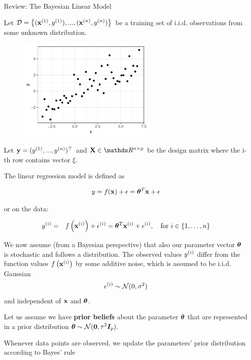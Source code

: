 \documentclass[11pt,compress,t,notes=noshow, xcolor=table]{beamer}
\begin{document}
\begin{vbframe}{Review: The Bayesian Linear Model}

Let $\D = \left\{(\xi[1], \yi[1]), ..., (\xi[n], \yi[n])\right\}$ be a training set of i.i.d. observations from some unknown distribution.

\begin{figure}
  \includegraphics[width=0.6\textwidth]{figure/bayes_lm/example.pdf}
\end{figure}

Let $\yv = (\yi[1], ..., \yi[n])^\top$ and $\Xmat \in \R^{n \times p}$ be the design matrix where the i-th row contains vector $\xi$.  

\framebreak

The linear regression model is defined as

$$
y = \fx + \epsilon = \thetab^T \xv + \epsilon 
$$

or on the data:

\begin{eqnarray*}
\yi &=& \fxi + \epsi = \thetab^T \xi + \epsi, \quad \text{for } i \in \{1, \ldots, n\}
\end{eqnarray*}


We now assume (from a Bayesian perspective) that also our parameter vector $\thetab$ is stochastic and follows a distribution.
The observed values $\yi$ differ from the function values $\fxi$ by some additive noise, which is assumed to be i.i.d. Gaussian 
$$
\epsi \sim \mathcal{N}(0, \sigma^2)$$
and independent of $\xv$ and $\thetab$.

\framebreak

Let us assume we have \textbf{prior beliefs} about the parameter $\thetab$ that are represented in a prior distribution $\thetab \sim \mathcal{N}(\zero, \tau^2 \id_p).$

\lz 

Whenever data points are observed, we update the parameters' prior distribution according to Bayes' rule 


\end{vbframe}
\end{document}
